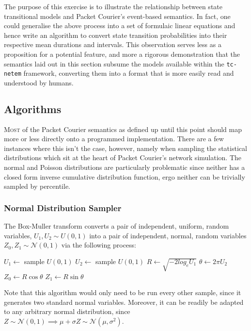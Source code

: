The purpose of this exercise is to illustrate the relationship between state transitional models and Packet Courier's
event-based semantics. In fact, one could generalise the above process into a set of formulaic linear equations and
hence write an algorithm to convert state transition probabilities into their respective mean durations and
intervals. This observation serves less as a proposition for a potential feature, and more a rigorous demonstration
that the semantics laid out in this section subsume the models available within the \texttt{tc-netem} framework,
converting them into a format that is more easily read and understood by humans.

\newpage

\subsection{Algorithms}

\lettrine{M}{ost} of the Packet Courier semantics as defined up until this point should map more or less directly onto a
programmed implementation. There are a few instances where this isn't the case, however, namely when sampling the
statistical distributions which sit at the heart of Packet Courier's network simulation. The normal and Poisson
distributions are particularly problematic since neither has a closed form inverse cumulative distribution function,
ergo neither can be trivially sampled by percentile.

\subsubsection{Normal Distribution Sampler}

The Box-Muller transform converts a pair of independent, uniform, random variables, $U_1, U_2 \sim U(0, 1)$ into a pair
of independent, normal, random variables $Z_0, Z_1 \sim \mathcal{N}(0, 1)$\cite{box_muller_transform} via the
following process: \\

\begin{algorithm}[caption={Box-Muller Transform\cite{box_muller_transform}.},label={alg:box_muller_transform},
    captionpos=b]
    $U_1 \gets$ sample $U(0, 1)$
    $U_2 \gets$ sample $U(0, 1)$
    $R \gets \sqrt{-2 log_e U_1}$
    $\theta \gets 2 \pi U_2$
    $Z_0 \gets R \cos \theta$
    $Z_1 \gets R \sin \theta$
\end{algorithm}

Note that this algorithm would only need to be run every other sample, since it generates two standard normal
variables. Moreover, it can be readily be adapted to any arbitrary normal distribution, since $Z \sim \mathcal{N}(0,
1) \implies \mu + \sigma Z \sim \mathcal{N}(\mu, \sigma^2)$.

